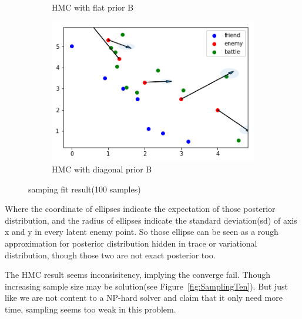 \documentclass{article}
\begin{document}
\begin{figure}[h]
\begin{subfigure}[b]{0.45\linewidth}
    \caption{HMC with flat prior B}
  \end{subfigure}
  \begin{subfigure}[b]{0.45\linewidth}
    \includegraphics[width=\linewidth]{Sampling22.png}
    \caption{HMC with diagonal prior B}
  \end{subfigure}
  \caption{samping fit result(100 samples)}
  \label{fig:samping}
\end{figure}

Where the coordinate of ellipses indicate the expectation of those posterior distribution,
and the radius of ellipses indicate the standard deviation(sd) of axis x and y in every latent enemy point.
So those ellipse can be seen as a rough approximation for posterior distribution 
hidden in trace or variational distribution, though those two are not exact posterior too.

The HMC result seems inconsisitency, implying the converge fail. Though increasing sample size may be
solution(see Figure~\ref{fig:SamplingTen}). But just like we are not content to a NP-hard solver and claim that it only need more time,
sampling seems too weak in this problem.
\end{document}
